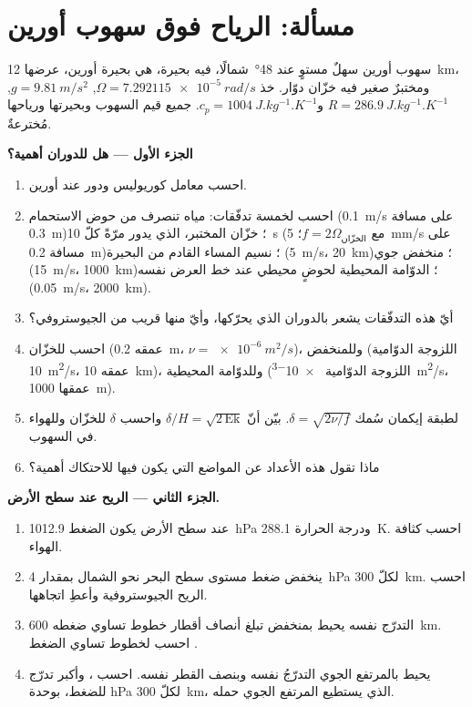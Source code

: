 \section{مسألة: الرياح فوق سهوب أورين}

\begin{problem}
\label{pb:b3:gfd-foundations:1}
سهوب أورين سهلٌ مستوٍ عند \ang{48}~شمالًا، فيه بحيرة، هي بحيرة أورين،
عرضها \qty{12}{km}، ومختبرٌ صغير فيه خزّان دوّار. خذ
$\Omega = \qty{7.292115e-5}{rad/s}$, $g = \qty{9.81}{m/s^2}$, $R =
\qty{286.9}{J.kg^{-1}.K^{-1}}$ و$c_p = \qty{1004}{J.kg^{-1}.K^{-1}}$.
جميع قيم السهوب وبحيرتها ورياحها مُخترعةٌ.

\medskip\noindent\textbf{الجزء الأول --- هل للدوران أهمية؟}
\begin{enumerate}
\item احسب معامل كوريوليس ودور  عند أورين.
\item احسب  لخمسة تدفّقات: مياه تنصرف من حوض الاستحمام
  (\qty{0.1}{m/s} على مسافة \qty{0.3}{m})؛ خزّان المختبر، الذي يدور
  مرّةً كلّ \qty{10}{s} (مع $f = 2\Omega_{\text{الخزّان}}$؛ \qty{5}{mm/s}
  على مسافة \qty{0.2}{m})؛ نسيم المساء القادم من البحيرة (\qty{5}{m/s}،
  \qty{20}{km})؛ منخفض جوي (\qty{15}{m/s}، \qty{1000}{km})؛ الدوّامة المحيطية لحوضٍ
  محيطي عند خط العرض نفسه (\qty{0.05}{m/s}، \qty{2000}{km}).
\item أيّ هذه التدفّقات يشعر بالدوران الذي يحرّكها، وأيّ منها
  قريب من الجيوستروفي؟
\item احسب  للخزّان (عمقه \qty{0.2}{m}، $\nu =
  \qty{e-6}{m^2/s}$)، وللمنخفض (اللزوجة الدوّامية \qty{10}{m^2/s}،
  عمقه \qty{10}{km})، وللدوّامة المحيطية (اللزوجة الدوّامية \qty{e-3}{m^2/s}،
  عمقها \qty{1000}{m}).
\item لطبقة إيكمان سُمك $\delta = \sqrt{2\nu/f}$. بيّن أنّ
  $\delta/H = \sqrt{2\,\mathrm{Ek}}$ واحسب $\delta$ للخزّان وللهواء
  في السهوب.
\item ماذا تقول هذه الأعداد عن المواضع التي يكون فيها للاحتكاك أهمية؟
\end{enumerate}

\medskip\noindent\textbf{الجزء الثاني --- الريح عند سطح الأرض.}
\begin{enumerate}[resume]
\item عند سطح الأرض يكون الضغط \qty{1012.9}{hPa} ودرجة الحرارة
  \qty{288.1}{K}. احسب كثافة الهواء.
\item ينخفض ضغط مستوى سطح البحر نحو الشمال بمقدار \qty{4}{hPa} لكلّ
  \qty{300}{km}. احسب الريح الجيوستروفية وأعطِ اتجاهها.
\item التدرّج نفسه يحيط بمنخفض تبلغ أنصاف أقطار خطوط تساوي ضغطه
  \qty{600}{km}. احسب  لخطوط تساوي الضغط .
\item يحيط بالمرتفع الجوي التدرّجُ نفسه وبنصف القطر نفسه.
  احسب ، وأكبر تدرّج للضغط، بوحدة
  \unit{hPa} لكلّ \qty{300}{km}، الذي يستطيع المرتفع الجوي حمله.
\end{enumerate}


\end{problem}
